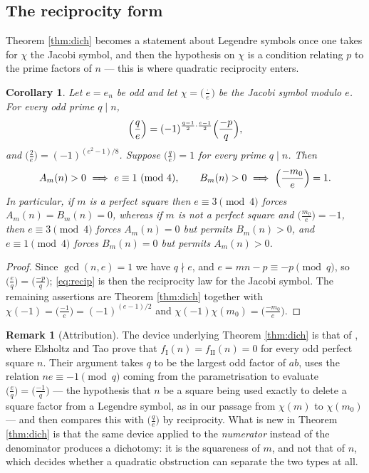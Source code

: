 \documentclass[11pt,reqno]{amsart}
\theoremstyle{plain}
\newtheorem{corollary}[theorem]{Corollary}
\theoremstyle{definition}
\newtheorem{remark}[theorem]{Remark}
\numberwithin{equation}{section}
\newcommand{\fI}{f_{\mathrm{I}}}
\newcommand{\fII}{f_{\mathrm{II}}}
\begin{document}
\subsection{The reciprocity form}
Theorem \ref{thm:dich} becomes a statement about Legendre symbols once one takes for
$\chi$ the Jacobi symbol, and then the hypothesis on $\chi$ is a condition relating
$p$ to the prime factors of $n$ --- this is where quadratic reciprocity enters.

\begin{corollary}\label{cor:recip}
Let $e=e_{n}$ be odd and let $\chi=\bigl(\tfrac{\cdot}{e}\bigr)$ be the Jacobi symbol
modulo $e$. For every odd prime $q\mid n$,
\begin{equation}\label{eq:recip}
  \Bigl(\frac qe\Bigr)=(-1)^{\frac{q-1}2\cdot\frac{e-1}2}\Bigl(\frac{-p}q\Bigr),
\end{equation}
and $\bigl(\tfrac2e\bigr)=(-1)^{(e^{2}-1)/8}$. Suppose $\bigl(\tfrac qe\bigr)=1$ for
every prime $q\mid n$. Then
\[
  A_{m}(n)>0\ \Longrightarrow\ e\equiv1\ (\mathrm{mod}\ 4),
  \qquad
  B_{m}(n)>0\ \Longrightarrow\ \Bigl(\frac{-m_{0}}e\Bigr)=1 .
\]
In particular, if $m$ is a perfect square then $e\equiv3\pmod4$ forces
$A_{m}(n)=B_{m}(n)=0$, whereas if $m$ is not a perfect square and
$\bigl(\tfrac{m_{0}}e\bigr)=-1$, then $e\equiv3\pmod 4$ forces $A_{m}(n)=0$ but
permits $B_{m}(n)>0$, and $e\equiv1\pmod4$ forces $B_{m}(n)=0$ but permits
$A_{m}(n)>0$.
\end{corollary}

\begin{proof}
Since $\gcd(n,e)=1$ we have $q\nmid e$, and $e=mn-p\equiv-p\pmod q$, so
$\bigl(\tfrac eq\bigr)=\bigl(\tfrac{-p}q\bigr)$; \eqref{eq:recip} is then the
reciprocity law for the Jacobi symbol. The remaining assertions are
Theorem \ref{thm:dich} together with $\chi(-1)=\bigl(\tfrac{-1}e\bigr)=(-1)^{(e-1)/2}$
and $\chi(-1)\chi(m_{0})=\bigl(\tfrac{-m_{0}}e\bigr)$.
\end{proof}

\begin{remark}[Attribution]\label{rem:etattr}
The device underlying Theorem \ref{thm:dich} is that of
\cite[Prop.~1.6]{ElsholtzTao}, where Elsholtz and Tao prove that
$\fI(n)=\fII(n)=0$ for every odd perfect square $n$. Their argument takes $q$ to be
the largest odd factor of $ab$, uses the relation $ne\equiv-1\pmod q$ coming from the
parametrisation to evaluate $\bigl(\tfrac eq\bigr)=\bigl(\tfrac{-1}q\bigr)$ --- the
hypothesis that $n$ be a square being used exactly to delete a square factor from a
Legendre symbol, as in our passage from $\chi(m)$ to $\chi(m_{0})$ --- and then
compares this with $\bigl(\tfrac qe\bigr)$ by reciprocity. What is new in Theorem
\ref{thm:dich} is that the same device applied to the \emph{numerator} instead of the
denominator produces a dichotomy: it is the squareness of $m$, and not that of $n$,
which decides whether a quadratic obstruction can separate the two types at all.
\end{remark}
\end{document}

